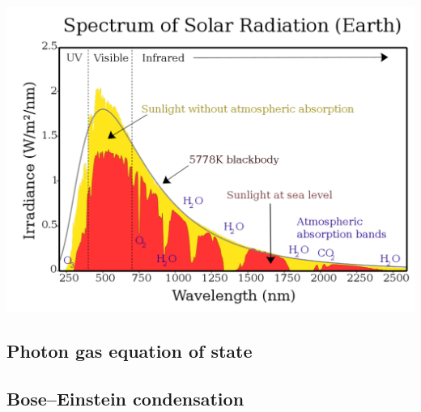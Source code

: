 \begin{center}\includegraphics[width=\textwidth]{figs/week08_sun.pdf}\end{center}






\newpage
\subsection{Photon gas equation of state}



\newpage
\subsection{Bose--Einstein condensation}
